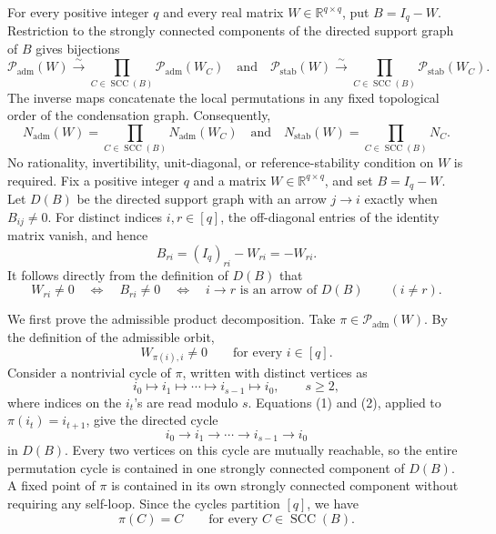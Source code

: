 For every positive integer \(q\) and every real matrix \(W\in\mathbb R^{q\times q}\), put \(B=I_q-W\). Restriction to the strongly connected components of the directed support graph of \(B\) gives bijections
\[
 \mathcal P_{\mathrm{adm}}(W)
 \xrightarrow{\ \sim\ }
 \prod_{C\in\operatorname{SCC}(B)}
 \mathcal P_{\mathrm{adm}}(W_C)
 \quad\text{and}\quad
 \mathcal P_{\mathrm{stab}}(W)
 \xrightarrow{\ \sim\ }
 \prod_{C\in\operatorname{SCC}(B)}
 \mathcal P_{\mathrm{stab}}(W_C).
\]
The inverse maps concatenate the local permutations in any fixed topological order of the condensation graph. Consequently,
\[
 N_{\mathrm{adm}}(W)
 =\prod_{C\in\operatorname{SCC}(B)}N_{\mathrm{adm}}(W_C)
 \quad\text{and}\quad
 N_{\mathrm{stab}}(W)
 =\prod_{C\in\operatorname{SCC}(B)}N_C.
\]
No rationality, invertibility, unit-diagonal, or reference-stability condition on \(W\) is required.
Fix a positive integer \(q\) and a matrix \(W\in\mathbb R^{q\times q}\), and set \(B=I_q-W\). Let \(D(B)\) be the directed support graph with an arrow \(j\to i\) exactly when \(B_{ij}\neq0\). For distinct indices \(i,r\in[q]\), the off-diagonal entries of the identity matrix vanish, and hence
\[
 B_{ri}=(I_q)_{ri}-W_{ri}=-W_{ri}.
\]
It follows directly from the definition of \(D(B)\) that
\[
 W_{ri}\neq0
 \quad\Longleftrightarrow\quad
 B_{ri}\neq0
 \quad\Longleftrightarrow\quad
 i\to r\text{ is an arrow of }D(B)
 \qquad(i\neq r). \tag{1}
\]

We first prove the admissible product decomposition. Take \(\pi\in\mathcal P_{\mathrm{adm}}(W)\). By the definition of the admissible orbit,
\[
 W_{\pi(i),i}\neq0\qquad\text{for every }i\in[q]. \tag{2}
\]
Consider a nontrivial cycle of \(\pi\), written with distinct vertices as
\[
 i_0\mapsto i_1\mapsto\cdots\mapsto i_{s-1}\mapsto i_0,
 \qquad s\ge2,
\]
where indices on the \(i_t\)'s are read modulo \(s\). Equations (1) and (2), applied to \(\pi(i_t)=i_{t+1}\), give the directed cycle
\[
 i_0\to i_1\to\cdots\to i_{s-1}\to i_0
\]
in \(D(B)\). Every two vertices on this cycle are mutually reachable, so the entire permutation cycle is contained in one strongly connected component of \(D(B)\). A fixed point of \(\pi\) is contained in its own strongly connected component without requiring any self-loop. Since the cycles partition \([q]\), we have
\[
 \pi(C)=C
 \qquad\text{for every }C\in\operatorname{SCC}(B). \tag{3}
\]

